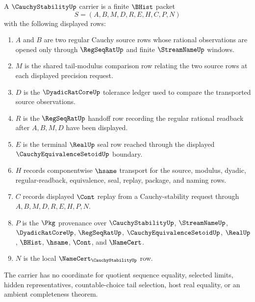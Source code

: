\begin{definition}
\label{def:cauchy-stability-carrier}
A $\CauchyStabilityUp$ carrier is a finite $\BHist$ packet
$$
S=(A,B,M,D,R,E,H,C,P,N)
$$
with the following displayed rows:
\begin{enumerate}
\item $A$ and $B$ are two regular Cauchy source rows whose rational observations are opened only through $\RegSeqRatUp$ and finite $\StreamNameUp$ windows.
\item $M$ is the shared tail-modulus comparison row relating the two source rows at each displayed precision request.
\item $D$ is the $\DyadicRatCoreUp$ tolerance ledger used to compare the transported source observations.
\item $R$ is the $\RegSeqRatUp$ handoff row recording the regular rational readback after $A,B,M,D$ have been displayed.
\item $E$ is the terminal $\RealUp$ seal row reached through the displayed $\CauchyEquivalenceSetoidUp$ boundary.
\item $H$ records componentwise $\hsame$ transport for the source, modulus, dyadic, regular-readback, equivalence, seal, replay, package, and naming rows.
\item $C$ records displayed $\Cont$ replay from a Cauchy-stability request through $A,B,M,D,R,E,H,P,N$.
\item $P$ is the $\Pkg$ provenance over $\CauchyStabilityUp$, $\StreamNameUp$, $\DyadicRatCoreUp$, $\RegSeqRatUp$, $\CauchyEquivalenceSetoidUp$, $\RealUp$, $\BHist$, $\hsame$, $\Cont$, and $\NameCert$.
\item $N$ is the local $\NameCert_{\CauchyStabilityUp}$ row.
\end{enumerate}
The carrier has no coordinate for quotient sequence equality, selected limits, hidden representatives, countable-choice tail selection, host real equality, or an ambient completeness theorem.
\end{definition}

